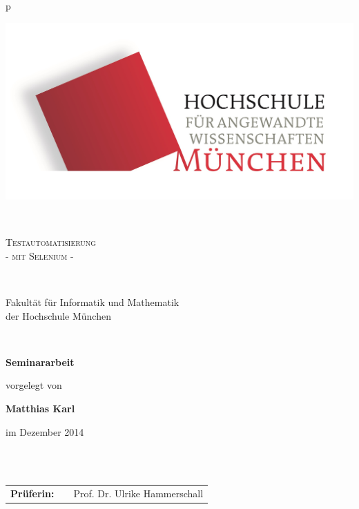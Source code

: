 \begin{center}
\begin{tabular}{p{\textwidth}}


\begin{center}
\includegraphics[scale=0.17]{img/logos.jpg}
\end{center}


\\

\begin{center}
\LARGE{\textsc{
Testautomatisierung \\  \large{- mit Selenium -}
}}
\end{center}

\\


\begin{center}
\large{Fakultät für Informatik und Mathematik \\
der Hochschule München \\}
\end{center}

\\

\begin{center}
\textbf{\Large{Seminararbeit}}
\end{center}



\begin{center}
vorgelegt von
\end{center}

\begin{center}
\large{\textbf{Matthias Karl}} \\
\end{center}

\begin{center}
\large{im Dezember 2014}
\end{center}

\\

\\

\begin{center}
\begin{tabular}{lll}
\textbf{Prüferin:} & & Prof. Dr. Ulrike Hammerschall\\
\end{tabular}
\end{center}

\end{tabular}
\end{center}